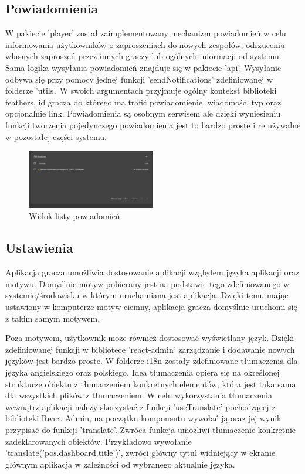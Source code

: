 \subsection{Powiadomienia}

W pakiecie 'player' został zaimplementowany mechanizm powiadomień w celu informowania użytkowników o zaproszeniach do nowych zespołów, odrzuceniu własnych zaproszeń przez innych graczy lub ogólnych informacji od systemu. Sama logika wysyłania powiadomień znajduje się w pakiecie 'api'. Wysyłanie odbywa się przy pomocy jednej funkcji 'sendNotifications' zdefiniowanej w folderze 'utils'. W swoich argumentach przyjmuje ogólny kontekst biblioteki feathers, id gracza do którego ma trafić powiadomienie, wiadomość, typ oraz opcjonalnie link. Powiadomienia są osobnym serwisem ale dzięki wyniesieniu funkcji tworzenia pojedynczego powiadomienia jest to bardzo proste i re używalne w pozostałej części systemu.

\begin{figure}[h!]
  \centering
    \includegraphics[width=0.5\textwidth]{images/player/notifications.png}
  \caption{Widok listy powiadomień}
  \label{fig:mobile}
\end{figure}

\subsection{Ustawienia}

Aplikacja gracza umożliwia dostosowanie aplikacji względem języka aplikacji oraz motywu. Domyślnie motyw pobierany jest na podstawie tego zdefiniowanego w systemie/środowisku w którym uruchamiana jest aplikacja. Dzięki temu mając ustawiony w komputerze motyw ciemny, aplikacja gracza domyślnie uruchomi się z takim samym motywem.

Poza motywem, użytkownik może również dostosować wyświetlany język. Dzięki zdefiniowanej funkcji w bibliotece 'react-admin' zarządzanie i dodawanie nowych języków jest bardzo proste. W folderze i18n zostały zdefiniowane tłumaczenia dla języka angielskiego oraz polskiego. Idea tłumaczenia opiera się na określonej strukturze obiektu z tłumaczeniem konkretnych elementów, która jest taka sama dla wszystkich plików z tłumaczeniem. W celu wykorzystania tłumaczenia wewnątrz aplikacji należy skorzystać z funkcji 'useTranslate' pochodzącej z biblioteki React Admin, na początku komponentu wywołać ją oraz jej wynik przypisać do funkcji 'translate'. Zwróca funkcja umożliwi tłumaczenie konkretnie zadeklarowanych obiektów. Przykładowo wywołanie 'translate('pos.dashboard.title')', zwróci główny tytuł widniejący w ekranie głównym aplikacja w zależności od wybranego aktualnie języka.

